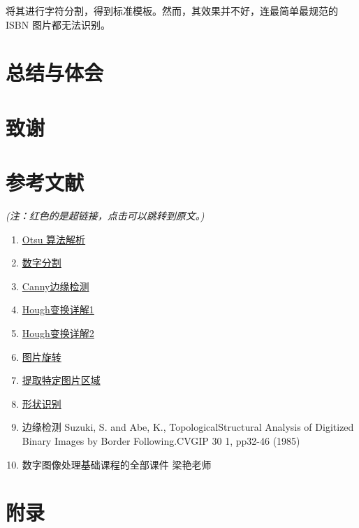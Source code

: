 \documentclass{ctexart}
\begin{document}
将其进行字符分割，得到标准模板。然而，其效果并不好，连最简单最规范的 ISBN 图片都无法识别。


\section{总结与体会}
\section{致谢}
\section{参考文献}


\textit{(注：红色的是超链接，点击可以跳转到原文。)}

\begin{enumerate}
    \item \href{https://blog.csdn.net/a15779627836/article/details/124151125}{Otsu 算法解析}
    \item \href{https://www.cnblogs.com/skyfsm/p/8029668.html}{数字分割}
    \item \href{https://blog.csdn.net/weixin_42272768/article/details/111244896}{Canny边缘检测}
    \item \href{https://blog.csdn.net/qq_30460949/article/details/90293147}{Hough变换详解1}
    \item \href{https://blog.csdn.net/qq_41112170/article/details/125729100}{Hough变换详解2}
    \item \href{https://blog.csdn.net/wyx100/article/details/80541726}{图片旋转}
    \item \href{https://blog.csdn.net/weixin_47365088/article/details/116566822}{提取特定图片区域}
    \item \href{https://blog.csdn.net/LPYchengxuyuan/article/details/122003702?utm_medium=distribute.pc_relevant.none-task-blog-2~default~baidujs_baidulandingword~default-0-122003702-blog-124125975.pc_relevant_aa&spm=1001.2101.3001.4242.1&utm_relevant_index=3}{形状识别}
    \item 边缘检测 Suzuki, S. and Abe, K., TopologicalStructural Analysis of Digitized Binary Images by Border Following.CVGIP 30 1, pp32-46 (1985)
    \item 数字图像处理基础课程的全部课件 梁艳老师
\end{enumerate}

\section{附录}
\end{document}
